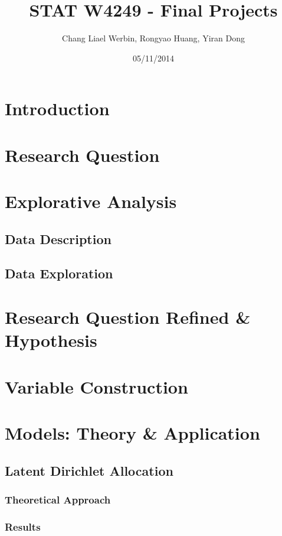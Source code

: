 \documentclass[9pt,notitlepage]{article}		%
\title{STAT W4249 - Final Projects}
\author{Chang Liael Werbin, Rongyao Huang, Yiran Dong}
\date{05/11/2014}
\begin{document}
\maketitle

\section{Introduction}

\section{Research Question}

\section{Explorative Analysis}

\subsection{Data Description}
\subsection{Data Exploration}

\section{Research Question Refined \& Hypothesis}

\section{Variable Construction}

\section{Models: Theory \& Application}

\subsection{Latent Dirichlet Allocation}

\subsubsection*{Theoretical Approach}
\subsubsection*{Results}
\end{document}
